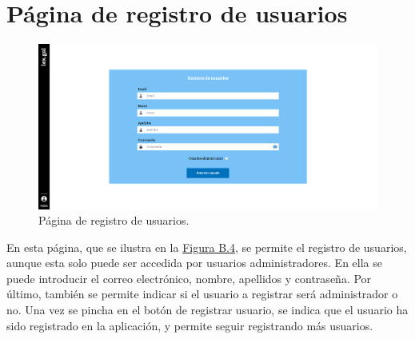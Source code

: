 \section{Página de registro de usuarios}
\label{PRegistroUsuarios}

\begin{figure}[H]
\centerline{\includegraphics[width=12cm]{figuras/manualUsuario/RegistroUsuario.PNG}}
\caption{Página de registro de usuarios.}
\label{enlacePRegistroUsuarios}
\end{figure}

En esta página, que se ilustra en la \hyperref[enlacePRegistroUsuarios]{Figura B.4}, se permite el registro de usuarios, aunque esta solo puede ser accedida por usuarios administradores. En ella se puede introducir el correo electrónico, nombre, apellidos y contraseña. Por último, también se permite indicar si el usuario a registrar será administrador o no. Una vez se pincha en el botón de registrar usuario, se indica que el usuario ha sido registrado en la aplicación, y permite seguir registrando más usuarios.